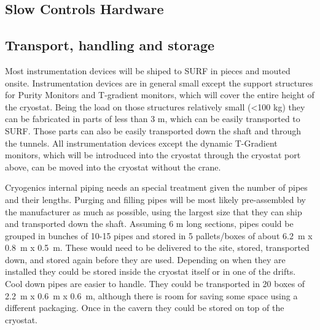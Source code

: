 \subsection{Slow Controls Hardware}
\label{sec:fdgen-slow-cryo-install-sc-hard}



\subsection{Transport, handling and storage}
\label{sec:fdgen-slow-cryo-install-transport}

Most instrumentation devices will be shiped to SURF in pieces and mouted onsite. 
Instrumentation devices are in general small except the support structures for Purity Monitors and T-gradient monitors,
which will cover the entire height of the cryostat. Being the load on those structures relatively small (<100 kg) they can be fabricated in parts of less than 3 m,
which can be easily transported to SURF. Those parts can also be easily transported down the shaft and through the tunnels.
All instrumentation devices except the dynamic T-Gradient monitors, which will be introduced into the cryostat through the cryostat port above, can be
moved into the cryostat without the crane.

Cryogenics internal piping needs an special treatment given the number of pipes and their lengths.
Purging and filling pipes will be most likely pre-assembled by the manufacturer as much as possible, using the largest  
size that they can ship and transported down the shaft. Assuming 6 m long sections,
pipes could be grouped in bunches of 10-15 pipes and stored in 5 pallets/boxes of about \SI{6.2}{m} x \SI{0.8}{m} x \SI{0.5}{m}. 
These would need to be delivered to the site, stored, transported down, and stored again before they are used.
Depending on when they are installed they could be stored inside the cryostat itself or in one of the drifts. 
Cool down pipes are easier to handle. They could be transported in 20 boxes of \SI{2.2}{m} x \SI{0.6}{m} x \SI{0.6}{m}, although
there is room for saving some space using a different packaging. 
Once in the cavern they could be stored on top of the cryostat.



